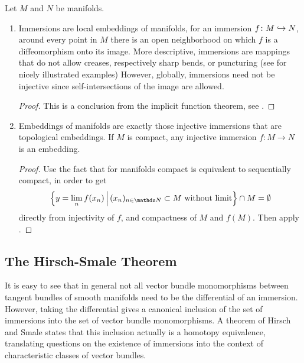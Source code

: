 \begin{Rem}
  Let $M$ and $N$ be manifolds.
  \begin{enumerate}
  \item
    Immersions are local embeddings of manifolds, \idest for an
    immersion $f\colon M\hookrightarrow N$, around every point in $M$
    there is an open neighborhood on which $f$ is a diffeomorphism
    onto its image.
    More descriptive, immersions are mappings that do not allow creases,
    respectively sharp bends, or puncturing
    (see \forexample \cite{outsidein} for nicely illustrated examples)
    However, globally, immersions need not be injective since
    \forexample self-intersections of the image are allowed.
    \begin{proof}
      This is a conclusion from the implicit function theorem,
      see \forexample \cite[Chap.~1, Theorem~3.1]{hirsch}.
    \end{proof}
  \item Embeddings of manifolds are exactly those injective immersions
    that are topological embeddings.
    If $M$ is compact, any injective immersion $f\colon M\to N$ is an
    embedding.
    \begin{proof}
      Use the fact that for manifolds compact is equivalent to
      sequentially compact, in order to get
      \begin{gather*}
        \left\{
          y=\lim_n f(x_n) \,\middle|\,
          (x_n)_{n\in\Nat}\subset M \text{ without limit}
        \right\} \cap M = \emptyset
      \end{gather*}
      directly from injectivity of $f$, and compactness of $M$ and
      $f(M)$.
      Then apply \cite[Chap.~II, Lemma~2.6]{adachi}.
    \end{proof}
  \end{enumerate}
\end{Rem}

\subsection{The Hirsch-Smale Theorem}\label{sec:hirschsmale}
It is easy to see that in general not all vector bundle monomorphisms
between tangent bundles of smooth manifolds need to be the
differential of an immersion. However, taking the differential gives a
canonical inclusion of the set of immersions into the set of vector
bundle monomorphisms.
A theorem of Hirsch and Smale states that this inclusion
actually is a homotopy equivalence,
translating questions on the existence of immersions into the context
of characteristic classes of vector bundles.

